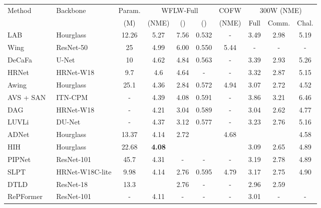 \documentclass[10pt,twocolumn,letterpaper]{article}
\begin{document}
\begin{table*}[t]
\centering
\begin{tabular}{llcccccccc} 
\toprule
\multicolumn{1}{l}{\multirow{2}{*}{Method}} & \multicolumn{1}{l}{\multirow{2}{*}{Backbone}} & \multirow{1}{*}{Param.} & \multicolumn{3}{c}{WFLW-Full}                    & \multicolumn{1}{c}{COFW} & \multicolumn{3}{c}{300W (NME)}  \\ 
\cmidrule{4-6}\cmidrule{8-10}
\multicolumn{1}{c}{} & \multicolumn{1}{c}{} & (M) & \multicolumn{1}{c}{(NME)} & () & () & (NME) & Full & Comm. & Chal. \\ 
\midrule
LAB~\cite{wu2018lab} & Hourglass  & 12.26 & 5.27 & 7.56 & 0.532 & - & 3.49 & 2.98 & 5.19 \\
Wing~\cite{feng2018wing} & ResNet-50  & 25 & 4.99 & 6.00 & 0.550 & 5.44 & - & - & - \\
DeCaFa~\cite{dapogny2019decafa} & U-Net & 10 & 4.62 & 4.84 & 0.563 & - & 3.39 & 2.93 & 5.26 \\
HRNet~\cite{hrnet} & HRNet-W18  & 9.7 & 4.6 & 4.64 & - & - & 3.32 & 2.87 & 5.15 \\
Awing~\cite{wang2019awing} & Hourglass  & 25.1 & 4.36 & 2.84 & 0.572 & 4.94 & 3.07 & 2.72 & 4.52 \\
AVS + SAN~\cite{qian2019avs} & ITN-CPM    & - & 4.39 & 4.08 & 0.591 & - & 3.86 & 3.21 & 6.46 \\
DAG~\cite{li20DAG} & HRNet-W18  & - & 4.21 & 3.04 & 0.589 & - & 3.04 & 2.62 & 4.77 \\
LUVLi~\cite{kumar2020luvli} & DU-Net     & - & 4.37 & 3.12 & 0.577 & - & 3.23 & 2.76 & 5.16 \\
ADNet~\cite{huang2021adnet} & Hourglass  & 13.37 & 4.14 & 2.72 & \textbf{\color{blue}{0.602}} & 4.68 & \textbf{\color{blue}{2.93}} & \textbf{\color{blue}{2.53}} & 4.58 \\
HIH~\cite{lan2021hih} & Hourglass & 22.68 & \textbf{\color{blue}4.08} & \textbf{\color{blue}{2.60}} & \textbf{\color{red}{0.605}} & \textbf{\color{blue}{4.63}} & 3.09 & 2.65 & 4.89 \\
PIPNet~\cite{JLS21pipnet} & ResNet-101 & 45.7 & 4.31 & - & - & - & 3.19 & 2.78 & 4.89 \\
SLPT~\cite{SLPT} & \scriptsize{HRNet-W18C-lite}  & 9.98 & 4.14 & 2.76 & 0.595 & 4.79 & 3.17 & 2.75 & 4.90 \\
DTLD~\cite{li2022DTLD} & ResNet-18  & 13.3 & \textbf{\color{blue}{4.08}} & 2.76 & - & - & 2.96 & 2.59 & \textbf{\color{blue}{4.50}} \\ 
RePFormer~\cite{li2022repformer} & ResNet-101 & - & 4.11 & - & - & - & 3.01 & - & - \\

\end{tabular}
\end{table*}
\end{document}
